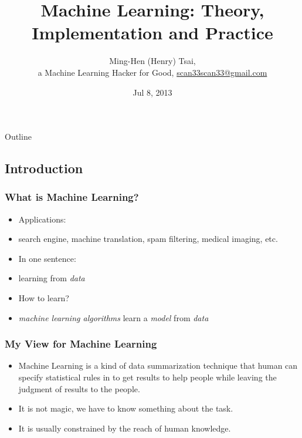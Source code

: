 \documentclass{beamer}
\begin{document}
\section{ }
\title[Machine Learning]{Machine Learning: Theory, Implementation and Practice}
\author[Ming-Hen Tsai]{
Ming-Hen (Henry) Tsai, \\
a Machine Learning Hacker for Good,
\url{scan33scan33@gmail.com}
}
\date{Jul 8, 2013}




\begin{frame}
\titlepage
\end{frame}

\begin{frame}{Outline}
\tableofcontents[pausesections]
\end{frame}

\subsection{Introduction}

\begin{frame}
  \frametitle{What is Machine Learning?}
  \begin{itemize}
    \item Applications:
    \pause
    \item [] search engine, machine translation, spam filtering, medical imaging, etc.
    \pause
    \item In one sentence:
    \pause
    \item [] learning from {\it data}
    \pause
    \item How to learn?
    \pause
    \item [] {\it machine learning algorithms} learn a {\it model} from {\it data} 
  \end{itemize}
\end{frame}

\begin{frame}
  \frametitle{My View for Machine Learning}
  \begin{itemize}
    \item Machine Learning is a kind of data summarization technique that human can specify statistical rules in to get results to help people while leaving the judgment of results to the people.
    \pause
    \item It is not magic, we have to know something about the task.
    \pause
    \item It is usually constrained by the reach of human knowledge.
  \end{itemize}
\end{frame}
\end{document}
